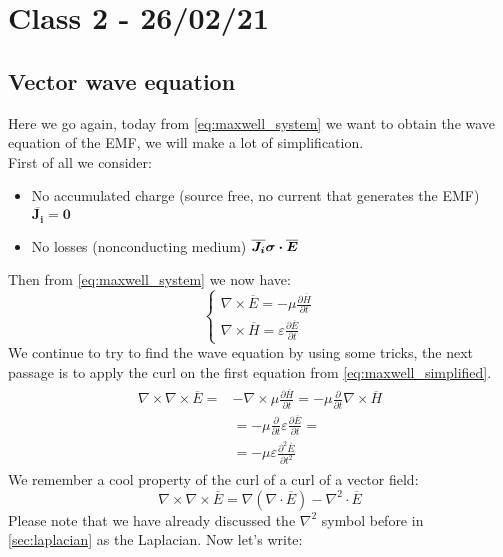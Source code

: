 \section{Class 2 - 26/02/21}
\subsection*{Vector wave equation}
Here we go again, today from \cref{eq:maxwell_system} we want to obtain the wave equation of the EMF, we will make a lot of simplification.\\
First of all we consider:
\begin{itemize}
    \item No accumulated charge (source free, no current that generates the EMF) $\boldsymbol{\overline{J_i}=0}$
    \item No losses (nonconducting medium) $\boldsymbol{\overline{J_i}$ $\sigma \cdot\overline{E}}$
\end{itemize}
Then from \cref{eq:maxwell_system} we now have:
\begin{equation}\label{eq:maxwell_simplified}
    \begin{cases}
    \nabla\times\overline{E}=-\mu\frac{\partial \overline{H}}{\partial t}\\[5pt]
    \nabla\times\overline{H}=\varepsilon\frac{\partial \overline{E}}{\partial t}
    \end{cases}
\end{equation}
We continue to try to find the wave equation by using some tricks, the next passage is to apply the curl on the first equation from \cref{eq:maxwell_simplified}.
\begin{align}
    \begin{split}
        \nabla\times\nabla\times\overline{E}=&-\nabla\times\mu \frac{\partial \overline{H}}{\partial t}=-\mu \frac{\partial}{\partial t} \nabla\times \overline{H}\\[5pt]
        &=-\mu \frac{\partial}{\partial t}\varepsilon\frac{\partial \overline{E}}{\partial t}=\\[5pt]
        &=-\mu \varepsilon \frac{\partial^2\overline{E}}{\partial t^2}
    \end{split}
\end{align}
We remember a cool property of the curl of a curl of a vector field:
\begin{equation}
    \nabla\times\nabla\times\overline{E}=\nabla(\nabla\cdot \overline{E})-\nabla^2\cdot\overline{E}
\end{equation}
Please note that we have already discussed the $\nabla^2$ symbol before in \cref{sec:laplacian} as the Laplacian. Now let's write:
